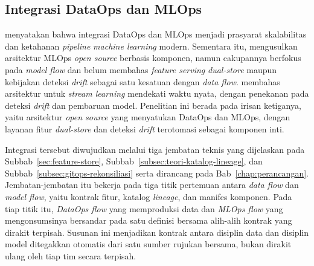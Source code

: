 \subsection{Integrasi DataOps dan MLOps}
\label{subsec:integrasi}

\textcite{jain2025integrating} menyatakan bahwa integrasi DataOps dan MLOps menjadi prasyarat skalabilitas dan ketahanan \textit{pipeline} \textit{machine learning} modern. Sementara itu, \textcite{burgueno2025toward} mengusulkan arsitektur MLOps \textit{open source} berbasis komponen, namun cakupannya berfokus pada \textit{model flow} dan belum membahas \textit{feature serving} \textit{dual-store} maupun kebijakan deteksi \textit{drift} sebagai satu kesatuan dengan \textit{data flow}. \textcite{rodrigues2025architecture} membahas arsitektur untuk \textit{stream learning} mendekati waktu nyata, dengan penekanan pada deteksi \textit{drift} dan pembaruan model. Penelitian ini berada pada irisan ketiganya, yaitu arsitektur \textit{open source} yang menyatukan DataOps dan MLOps, dengan layanan fitur \textit{dual-store} dan deteksi \textit{drift} terotomasi sebagai komponen inti.

Integrasi tersebut diwujudkan melalui tiga jembatan teknis yang dijelaskan pada Subbab~\ref{sec:feature-store}, Subbab~\ref{subsec:teori-katalog-lineage}, dan Subbab~\ref{subsec:gitops-rekonsiliasi} serta dirancang pada Bab~\ref{chap:perancangan}. Jembatan-jembatan itu bekerja pada tiga titik pertemuan antara \textit{data flow} dan \textit{model flow}, yaitu kontrak fitur, katalog \textit{lineage}, dan manifes komponen. Pada tiap titik itu, \textit{DataOps flow} yang memproduksi data dan \textit{MLOps flow} yang mengonsumsinya bersandar pada satu definisi bersama alih-alih kontrak yang dirakit terpisah. Susunan ini menjadikan kontrak antara disiplin data dan disiplin model ditegakkan otomatis dari satu sumber rujukan bersama, bukan dirakit ulang oleh tiap tim secara terpisah.

